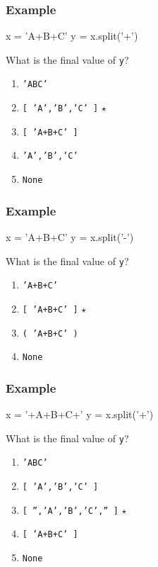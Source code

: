 \documentclass[11pt]{beamer}
\begin{document}
\begin{frame}[fragile]
  \frametitle{Example}
  \Enlarge

  \begin{semiverbatim}
x = 'A+B+C'
y = x.split('+')
  \end{semiverbatim}
  What is the final value of \texttt{y}?
  \begin{enumerate}[label=\Alph*]
  \item  \texttt{'ABC'}
  \item  \texttt{[ 'A','B','C' ]}  $\star$
  \item  \texttt{[ 'A+B+C' ]}
  \item  \texttt{'A','B','C'}
  \item  \texttt{None}
  \end{enumerate}
\end{frame}

\begin{frame}[fragile]
  \frametitle{Example}
  \Enlarge

  \begin{semiverbatim}
x = 'A+B+C'
y = x.split('-')
  \end{semiverbatim}
  What is the final value of \texttt{y}?
  \begin{enumerate}[label=\Alph*]
  \item  \texttt{'A+B+C'}
  \item  \texttt{[ 'A+B+C' ]}  $\star$
  \item  \texttt{( 'A+B+C' )}
  \item  \texttt{None}
  \end{enumerate}
\end{frame}

\begin{frame}[fragile]
  \frametitle{Example}
  \Enlarge

  \begin{semiverbatim}
x = '+A+B+C+'
y = x.split('+')
  \end{semiverbatim}
  What is the final value of \texttt{y}?
  \begin{enumerate}[label=\Alph*]
  \item  \texttt{'ABC'}
  \item  \texttt{[ 'A','B','C' ]}
  \item  \texttt{[ '','A','B','C','' ]}  $\star$
  \item  \texttt{[ 'A+B+C' ]}
  \item  \texttt{None}
  \end{enumerate}
\end{frame}
\end{document}
